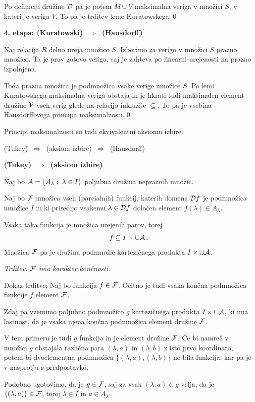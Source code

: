 \documentclass[11pt,paper=b5,footinclude,headinclude]{scrbook} %
\def\sledi {{~\Rightarrow~}}
\begin{document}
Po definiciji družine ${\cal D}$ pa je potem $M\cup V$ maksimalna veriga v množici $S$, v kateri je veriga $V$. To pa je trditev leme Kuratowskega.\qed

\bigskip
\textbf{4. etapa: (Kuratowski) $\sledi$ (Hausdorff)}

Naj relacija $R$ delno ureja množico $S$. Izberimo za verigo v množici $S$ prazno množico. Ta je prav gotovo veriga, saj je zahteva po linearni urejenosti na prazno izpolnjena.

Toda prazna množica je podmnožica vsake verige množice $S$. Po lemi Kuratowskega maksimalna veriga obstaja
in je
hkrati tudi maksimalen element družine ${\cal V}$ vseh verig glede na relacijo inkluzije $\subseteq$.
To pa je vsebina Hausdorffovega principa maksimalnosti.\qed

%
\bigskip

Principi maksimalnosti so tudi ekvivalentni aksiomu izbire:

(Tukey) $\sledi$ (aksiom izbire) $\sledi$ (Hausdorff)

\bigskip
\textbf{(Tukey) $\sledi$ (aksiom izbire)}

Naj bo ${\cal A} = \{A_\lambda~;~\lambda\in I\}$ poljubna družina nepraznih množic.

Naj bo ${\cal F}$ množica vseh (parcialnih) funkcij, katerih domena ${\cal D}f$ je podmnožica
množice $I$ in ki priredijo vsakemu $\lambda\in {\cal D}f$ določen element $f(\lambda)\in A_\lambda$.

Vsaka taka funkcija je množica urejenih parov, torej
$$f\subseteq I\times \cup {\cal A}\,.$$
Množica ${\cal F}$ pa je družina podmnožic kartezičnega produkta $I\times \cup {\cal A}$.

\emph{ Trditev: ${\cal F}$ ima karakter končnosti.}

Dokaz trditve: Naj bo funkcija $f\in{\cal F}$. Očitno je tudi vsaka končna podmnožica funkcije $f$ element ${\cal F}$.

Zdaj pa vzemimo poljubno podmnožico $g$ kartezičnega produkta $I\times \cup {\cal A}$,
ki ima lastnost, da je vsaka njena končna podmnožica element družine ${\cal F}$.

V tem primeru je tudi $g$ funkcija in je element družine ${\cal F}$. Če bi namreč v množici $g$ obstajala različna para $(\lambda,a)$ in $(\lambda,b)$ z isto prvo koordinato, potem bi dvoelementna podmnožica $\{(\lambda,a),(\lambda,b)\}$ ne bila funkcija, kar pa je v nasprotju s predpostavko.

Podobno ugotovimo, da je $g\in {\cal F}$, saj za vsak $(\lambda,a)\in g$ velja, da je
$\{(\lambda,a)\}\in {\cal F}$, torej $\lambda\in I$ in $a\in A_\lambda$.
\end{document}
